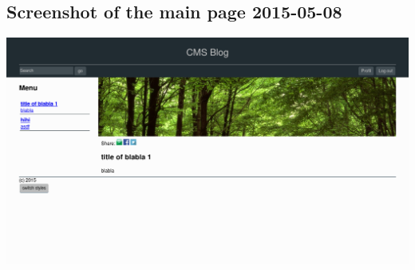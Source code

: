 \documentclass[11pt]{article}
\begin{document}
\subsection{Screenshot of the main page 2015-05-08}
\label{sec-1-2}
\includegraphics[width=.9\linewidth]{./info/img/screenshot-state-2015-05-08.png}
\end{document}
